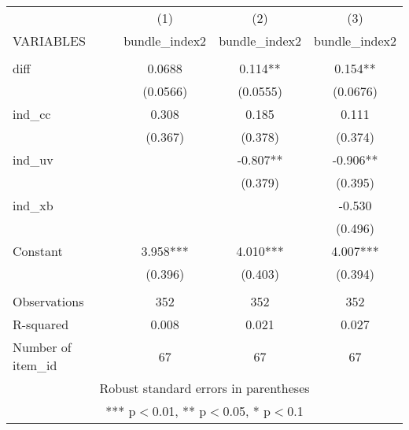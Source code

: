 \documentclass[]{article}
\begin{document}
\begin{tabular}{lccc} \hline
 & (1) & (2) & (3) \\
VARIABLES & bundle\_index2 & bundle\_index2 & bundle\_index2 \\ \hline
 &  &  &  \\
diff & 0.0688 & 0.114** & 0.154** \\
 & (0.0566) & (0.0555) & (0.0676) \\
ind\_cc & 0.308 & 0.185 & 0.111 \\
 & (0.367) & (0.378) & (0.374) \\
ind\_uv &  & -0.807** & -0.906** \\
 &  & (0.379) & (0.395) \\
ind\_xb &  &  & -0.530 \\
 &  &  & (0.496) \\
Constant & 3.958*** & 4.010*** & 4.007*** \\
 & (0.396) & (0.403) & (0.394) \\
 &  &  &  \\
Observations & 352 & 352 & 352 \\
R-squared & 0.008 & 0.021 & 0.027 \\
 Number of item\_id & 67 & 67 & 67 \\ \hline
\multicolumn{4}{c}{ Robust standard errors in parentheses} \\
\multicolumn{4}{c}{ *** p$<$0.01, ** p$<$0.05, * p$<$0.1} \\
\end{tabular}
\end{document}
